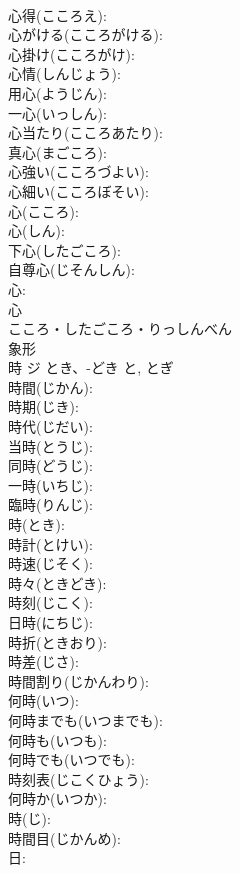 \documentclass[8pt]{extreport}
\begin{document}
\begin{CJK}{UTF8}{min}
\\	心得(こころえ): 
\\	心がける(こころがける): 
\\	心掛け(こころがけ): 
\\	心情(しんじょう): 
\\	用心(ようじん): 
\\	一心(いっしん): 
\\	心当たり(こころあたり): 
\\	真心(まごころ): 
\\	心強い(こころづよい): 
\\	心細い(こころぼそい): 
\\	心(こころ): 
\\	心(しん): 
\\	下心(したごころ): 
\\	自尊心(じそんしん): 
\\	心: 
\\	心	
\\	こころ・したごころ・りっしんべん	
\\	象形 
\\	時	ジ	とき、-どき	と, とぎ	
\\	時間(じかん): 
\\	時期(じき): 
\\	時代(じだい): 
\\	当時(とうじ): 
\\	同時(どうじ): 
\\	一時(いちじ): 
\\	臨時(りんじ): 
\\	時(とき): 
\\	時計(とけい): 
\\	時速(じそく): 
\\	時々(ときどき): 
\\	時刻(じこく): 
\\	日時(にちじ): 
\\	時折(ときおり): 
\\	時差(じさ): 
\\	時間割り(じかんわり): 
\\	何時(いつ): 
\\	何時までも(いつまでも): 
\\	何時も(いつも): 
\\	何時でも(いつでも): 
\\	時刻表(じこくひょう): 
\\	何時か(いつか): 
\\	時(じ): 
\\	時間目(じかんめ): 
\\	日: 

\end{CJK}
\end{document}
